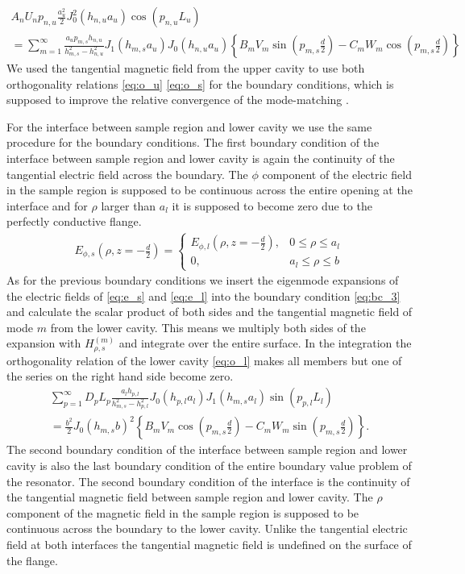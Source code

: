 \begin{gather}
A_nU_np_{n,u}\frac{a_u^2}{2}J_0^2(h_{n,u}a_u)\cos(p_{n,u}L_u)\nonumber\\=\sum\limits_{m=1}^\infty\frac{a_up_{m,s}h_{n,u}}{h_{m,s}^2-h_{n,u}^2}J_1(h_{m,s}a_u)J_0(h_{n,u}a_u)\left\{B_mV_m\sin(p_{m,s}\frac{d}{2})-C_mW_m\cos(p_{m,s}\frac{d}{2})\right\}\label{eq:mm_2}
\end{gather}
We used the tangential magnetic field from the upper cavity to use both orthogonality relations \eqref{eq:o_u} \eqref{eq:o_s} for the boundary conditions, which is supposed to improve the relative convergence of the mode-matching \cite{janezic}. 

For the interface between sample region and lower cavity we use the same procedure for the boundary conditions. The first boundary condition of the interface between sample region and lower cavity is again the continuity of the tangential electric field across the boundary. The $\phi$ component of the electric field in the sample region is supposed to be continuous across the entire opening at the interface and for $\rho$ larger than $a_l$ it is supposed to become zero due to the perfectly conductive flange. 
\begin{align}\label{eq:bc_3}
E_{\phi,s}\left(\rho,z=-\frac{d}{2}\right)= \begin{cases}
    E_{\phi,l}(\rho,z=-\frac{d}{2}) , & 0\leq\rho\leq a_l\\
    0, & a_l\leq\rho\leq b
  \end{cases}
\end{align}
As for the previous boundary conditions we insert the eigenmode expansions of the electric fields of \eqref{eq:e_s} and \eqref{eq:e_l} into the boundary condition \eqref{eq:bc_3} and calculate the scalar product of both sides and the tangential magnetic field of mode $m$ from the lower cavity. This means we multiply both sides of the expansion with $H_{\rho,s}^{(m)}$ and integrate over the entire surface. In the integration the orthogonality relation of the lower cavity \eqref{eq:o_l} makes all members but one of the series on the right hand side become zero.
\begin{gather}
\sum_{p=1}^\infty D_pL_p\frac{a_lh_{p,l}}{h_{m,s}^2-h_{p,l}^2}J_0(h_{p,l}a_l)J_1(h_{m,s}a_l)\sin(p_{p,l}L_l)\nonumber\\=\frac{b^2}{2}J_0(h_{m,s}b)^2\left\{ B_mV_m\cos(p_{m,s}\frac{d}{2})-C_mW_m\sin(p_{m,s}\frac{d}{2})\right\}\text{.}\label{eq:mm_3}
\end{gather}
The second boundary condition of the interface between sample region and lower cavity is also the last boundary condition of the entire boundary value problem of the resonator. The second boundary condition of the interface is the continuity of the tangential magnetic field between sample region and lower cavity. The $\rho$ component of the magnetic field in the sample region is supposed to be continuous across the boundary to the lower cavity. Unlike the tangential electric field at both interfaces the tangential magnetic field is undefined on the surface of the flange.
